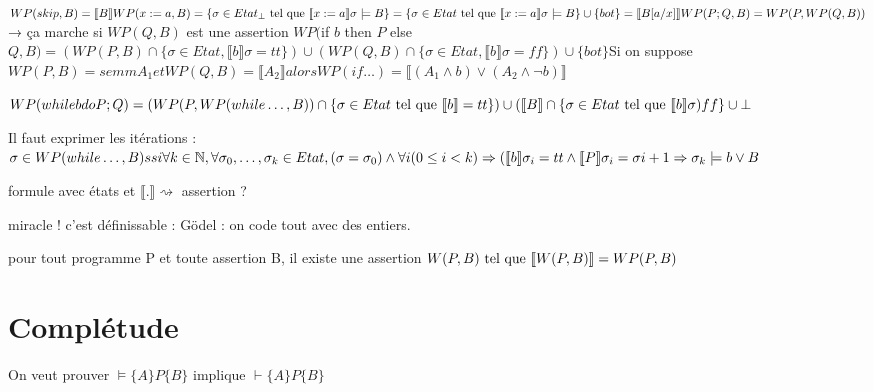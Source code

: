 \documentclass[10pt,a4paper]{article}
\newcommand{\semm}[1]{\llbracket #1 \rrbracket }
\newcommand{\semh}[3]{\{#1\}#2\{#3\}}
\begin{document}
$WP(skip,B) = \semm{B}
WP(x:=a,B) = \{ \sigma \in Etat_{\bot} \tq \semm{x := a} \sigma \models B\}
	   = \{ \sigma \in Etat \tq \semm{x := a} \sigma \models B\} \cup \{bot\} = \semm{B[a/x]}
WP(P;Q,B) = WP(P, WP(Q,B))$ → ça marche si $WP(Q,B)$ est une assertion
$WP($if $b$ then $P$ else $Q, B) = (WP(P,B) \cap \{\sigma \in Etat, \semm b \sigma = tt \})
			\cup (WP(Q,B) \cap \{\sigma \in Etat, \semm b \sigma = ff \})
			\cup \{bot\}
$Si on suppose $WP(P,B) = semm{A_1} et WP(Q,B) = \semm{A_2} alors WP(if \dots) = \semm{ ( A_1 \wedge b) \vee (A_2 \wedge \lnot b)}$

$WP(while b do P; Q) = (WP(P, WP(while \dots , B)) \cap \{\sigma \in Etat \tq \semm{b} = tt \})
		      \cup (\semm{B} \cap \{\sigma \in Etat \tq \semm b \sigma ) ff \}
		      \cup {\bot}$

Il faut exprimer les itérations : 
$\sigma \in WP(while \dots, B) ssi \forall k \in \Ns , \forall \sigma_0, \dots, \sigma_k \in Etat, 
				    (\sigma = \sigma_0) \wedge \forall i ( 0 \leq i < k) \Rightarrow (\semm{b} \sigma_i = tt \wedge \semm{P} \sigma_i = \sigma i+1
				    \Rightarrow \sigma_k \models b \vee B$

formule avec états et $\semm{.} \rightsquigarrow$ assertion ?

miracle ! c'est définissable : Gödel : on code tout avec des entiers.

\begin{thm}
 pour tout programme P et toute assertion B, il existe une assertion $W(P,B) \tq \semm{W(P,B)} = WP(P,B)$
\end{thm}

\section{Complétude}
On veut prouver $\models \semh{A}{P}{B}$ implique $\vdash \semh{A}{P}{B}$
\end{document}
